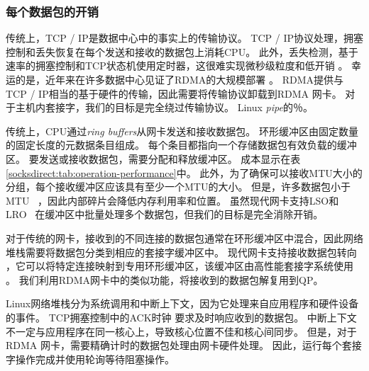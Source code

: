\subsubsection{每个数据包的开销}
\label{socksdirect:subsec:per-packet-overhead}
\quad

传统上，TCP / IP是数据中心中的事实上的传输协议。
TCP / IP协议处理，拥塞控制和丢失恢复在每个发送和接收的数据包上消耗CPU。
此外，丢失检测，基于速率的拥塞控制和TCP状态机使用定时器，这很难实现微秒级粒度和低开销 \cite{jeong2014mtcp}。
幸运的是，近年来在许多数据中心见证了RDMA的大规模部署 \cite {guo2016rdma,zhu2015congestion,mittal2015timely}。
RDMA提供与TCP / IP相当的基于硬件的传输，因此需要将传输协议卸载到RDMA 网卡。
对于主机内套接字，我们的目标是完全绕过传输协议。 Linux \emph {pipe}的％。

传统上，CPU通过\emph {ring buffers}从网卡发送和接收数据包。
环形缓冲区由固定数量的固定长度的元数据条目组成。
每个条目都指向一个存储数据包有效负载的缓冲区。
要发送或接收数据包，需要分配和释放缓冲区。
成本显示在表 \ref {socksdirect:tab:operation-performance}中。
此外，为了确保可以接收MTU大小的分组，每个接收缓冲区应该具有至少一个MTU的大小。
但是，许多数据包小于MTU~ \cite {thompson1997wide}，因此内部碎片会降低内存利用率和位置。
虽然现代网卡支持LSO和LRO~ \cite {lsolro}在缓冲区中批量处理多个数据包，但我们的目标是完全消除开销。

对于传统的网卡，接收到的不同连接的数据包通常在环形缓冲区中混合，因此网络堆栈需要将数据包分类到相应的套接字缓冲区中。
现代网卡支持接收数据包转向 \cite {mellanox}，它可以将特定连接映射到专用环形缓冲区，该缓冲区由高性能套接字系统使用 \cite {jeong2014mtcp,lin2016scalable,libvma}。
我们利用RDMA网卡中的类似功能，将接收到的数据包解复用到QP。

Linux网络堆栈分为系统调用和中断上下文，因为它处理来自应用程序和硬件设备的事件。
TCP拥塞控制中的ACK时钟 \cite {mprdma}要求及时响应收到的数据包。
中断上下文不一定与应用程序在同一核心上，导致核心位置不佳和核心间同步。
但是，对于RDMA 网卡，需要精确计时的数据包处理由网卡硬件处理。
因此，\libipc {}运行每个套接字操作完成并使用轮询等待阻塞操作。

